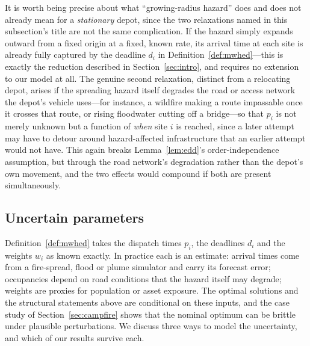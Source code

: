 \documentclass[pdflatex,sn-mathphys-ay]{sn-jnl}
\theoremstyle{thmstyleone}
\theoremstyle{thmstyletwo}
\theoremstyle{thmstylethree}
\begin{document}
It is worth being precise about what ``growing-radius hazard'' does
and does not already mean for a \emph{stationary} depot, since the two
relaxations named in this subsection's title are not the same
complication. If the hazard simply expands outward from a fixed origin
at a fixed, known rate, its arrival time at each site is already fully
captured by the deadline $d_i$ in Definition~\ref{def:mwhed}---this is
exactly the reduction described in Section~\ref{sec:intro}, and
requires no extension to our model at all. The genuine second
relaxation, distinct from a relocating depot, arises if the spreading
hazard itself degrades the road or access network the depot's vehicle
uses---for instance, a wildfire making a route impassable once it
crosses that route, or rising floodwater cutting off a bridge---so that
$p_i$ is not merely unknown but a function of \emph{when} site $i$ is
reached, since a later attempt may have to detour around
hazard-affected infrastructure that an earlier attempt would not have.
This again breaks Lemma~\ref{lem:edd}'s order-independence assumption,
but through the road network's degradation rather than the depot's own
movement, and the two effects would compound if both are present
simultaneously.

\subsection{Uncertain parameters}\label{sec:disc-stochastic}

Definition~\ref{def:mwhed} takes the dispatch times $p_i$, the
deadlines $d_i$ and the weights $w_i$ as known exactly. In practice
each is an estimate: arrival times come from a fire-spread, flood or
plume simulator and carry its forecast error; occupancies depend on road
conditions that the hazard itself may degrade; weights are proxies for
population or asset exposure. The optimal solutions and the structural
statements above are conditional on these inputs, and the case study of
Section~\ref{sec:campfire} shows that the nominal optimum can be brittle
under plausible perturbations. We discuss three ways to model the
uncertainty, and which of our results survive each.
\end{document}
